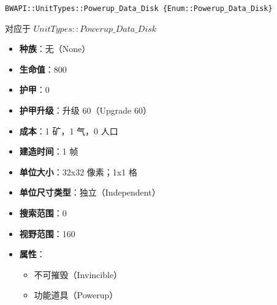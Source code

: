 \begin{tcolorbox}[colback=white, colframe=black!60!white, title=Powerup\_Data\_Disk(), arc=0mm]
    \begin{verbatim}
BWAPI::UnitTypes::Powerup_Data_Disk {Enum::Powerup_Data_Disk}
    \end{verbatim}
    对应于  $UnitTypes::Powerup\_Data\_Disk$ 
    \begin{itemize}
        \item \textbf{种族}：无（None）
        \item \textbf{生命值}：800
        \item \textbf{护甲}：0
        \item \textbf{护甲升级}：升级 60（Upgrade 60）
        \item \textbf{成本}：1 矿，1 气，0 人口
        \item \textbf{建造时间}：1 帧
        \item \textbf{单位大小}：32x32 像素；1x1 格
        \item \textbf{单位尺寸类型}：独立（Independent）
        \item \textbf{搜索范围}：0
        \item \textbf{视野范围}：160
        \item \textbf{属性}：
            \begin{itemize}
                \item 不可摧毁（Invincible）
                \item 功能道具（Powerup）
            \end{itemize}
    \end{itemize}
\end{tcolorbox}

